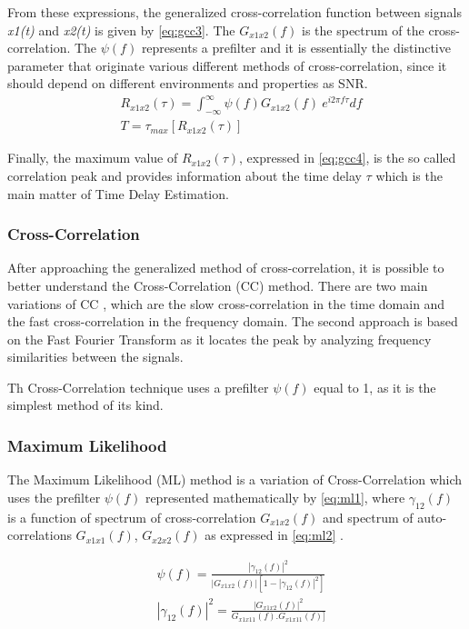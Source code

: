 From these expressions, the generalized cross-correlation function between signals \textit{x1(t)} and \textit{x2(t)} is given by \ref{eq:gcc3}. The $G_{x1x2}(f)$ is the spectrum of the cross-correlation. The $\psi(f)$ represents a prefilter and it is essentially the distinctive parameter that originate various different methods of cross-correlation, since it should depend on different environments and properties as SNR. 
\begin{eqnarray}
& R_{x1x2}(\tau) = \int_{-\infty}^{\infty} \psi(f) G_{x1x2}(f)\ e^{i2\pi f\tau} df
\label{eq:gcc3}\\
& T = \tau_{max} [ R_{x1x2}(\tau) ]
\label{eq:gcc4}
\end{eqnarray}

Finally, the maximum value of $R_{x1x2}(\tau)$, expressed in \ref{eq:gcc4}, is the so called correlation peak and provides information about the time delay $\tau$ which is the main matter of Time Delay Estimation. 


\subsubsection{Cross-Correlation}

After approaching the generalized method of cross-correlation, it is possible to better understand the Cross-Correlation (CC) method. There are two main variations of CC \cite{crosscorr}, which are the slow cross-correlation in the  time domain and the fast cross-correlation in the frequency domain. The second approach is based on the Fast Fourier Transform as it locates the peak by analyzing frequency similarities between the signals. 

Th Cross-Correlation technique uses a prefilter $\psi(f)$ equal to 1, as it is the simplest method of its kind.

\subsubsection{Maximum Likelihood}

The Maximum Likelihood (ML) method is a variation of Cross-Correlation which uses the prefilter $\psi(f)$ represented mathematically by \ref{eq:ml1}, where $\gamma_{12}(f)$ is a function of spectrum of cross-correlation $G_{x1x2}(f)$ and spectrum of auto-correlations $G_{x1x1}(f)$, $G_{x2x2}(f)$ as expressed in \ref{eq:ml2} \cite{crosscorr}.

\begin{eqnarray}
& \psi(f) = \frac{|\gamma_{12}(f)|^2}{|G_{x1x2}(f)|[1-|\gamma_{12}(f)|^2]}
\label{eq:ml1} \\
& |\gamma_{12}(f)|^2 = \frac{|G_{x1x2}(f)|^2}{G_{x1x11}(f) . G_{x1x11}(f)]}
\label{eq:ml2} 
\end{eqnarray}

